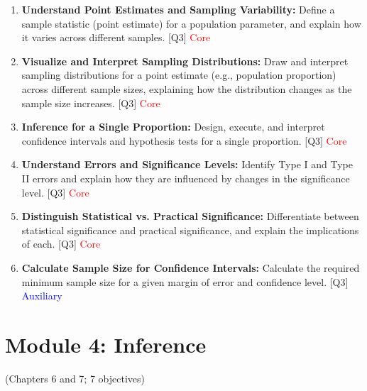 \documentclass[12pt]{article}
\begin{document}
\begin{enumerate}
    \item \textbf{Understand Point Estimates and Sampling Variability:} Define a sample statistic (point estimate) for a population parameter, and explain how it varies across different samples. [Q3] \textcolor{red}{Core} 
    \item \textbf{Visualize and Interpret Sampling Distributions:} Draw and interpret sampling distributions for a point estimate (e.g., population proportion) across different sample sizes, explaining how the distribution changes as the sample size increases. [Q3] \textcolor{red}{Core}
    \item \textbf{Inference for a Single Proportion:} Design, execute, and interpret confidence intervals and hypothesis tests for a single proportion. [Q3] \textcolor{red}{Core}
    \item \textbf{Understand Errors and Significance Levels:} Identify Type I and Type II errors and explain how they are influenced by changes in the significance level. [Q3] \textcolor{red}{Core}
    \item \textbf{Distinguish Statistical vs. Practical Significance:} Differentiate between statistical significance and practical significance, and explain the implications of each. [Q3] \textcolor{red}{Core}
    \item \textbf{Calculate Sample Size for Confidence Intervals:} Calculate the required minimum sample size for a given margin of error and confidence level. [Q3] \textcolor{blue}{Auxiliary}
\end{enumerate}

\newpage


\section{Module 4: Inference}
(Chapters 6 and 7; 7 objectives)

\end{document}
